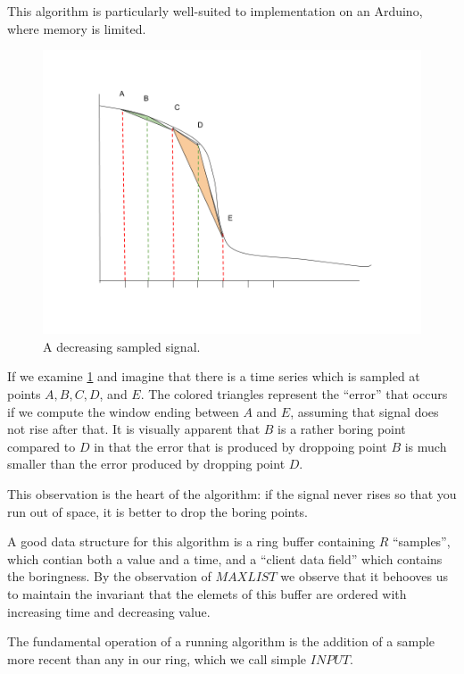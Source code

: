 \documentclass[11pt]{article}
\begin{document}
This algorithm is particularly well-suited to implementation on an Arduino,
where memory is limited.

\begin{figure}
  \includegraphics[width=\linewidth]{DROPBORINGLIN.png}
  \caption{A decreasing sampled signal.}
  \label{fig:boring}
\end{figure}

If we examine \ref{fig:boring} and imagine that there is a
time series which is sampled at points $A,B,C,D$, and $E$.
The colored triangles represent the ``error'' that
occurs if we compute the window ending between $A$ and $E$,
assuming that signal does not rise after that. It is
visually apparent that $B$ is a rather boring point compared
to $D$ in that the error that is produced by droppoing point
$B$ is much smaller than the error produced by dropping point $D$.

This observation is the heart of the algorithm: if the signal
never rises so that you run out of space, it is better to drop
the boring points.

A good data structure for this algorithm is a ring buffer
containing $R$ ``samples'', which contian both a value and a time,
and a ``client data field'' which contains the boringness.
By the observation of $MAXLIST$ we observe that
it behooves us to maintain the invariant that the elemets of this
buffer are ordered with increasing time and decreasing value.

The fundamental operation of a running algorithm is the addition
of a sample more recent than any in our ring, which we call
simple $INPUT$.
\end{document}
